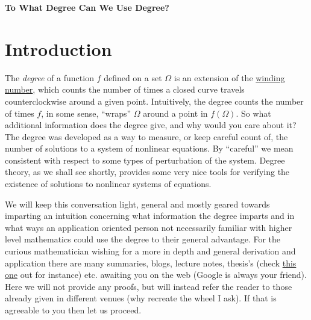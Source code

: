 \documentclass[11pt]{article}
\theoremstyle{plain}
\theoremstyle{definition}
\theoremstyle{remark}
\begin{document}
\begin{center}
\textbf{To What Degree Can We Use Degree?} %
\end{center}

\section{Introduction}
The \emph{degree} of a function $f$ defined on a set $\Omega$
is an extension of the \href{https://en.wikipedia.org/wiki/Winding_number}{winding number},
which counts the number of times a closed curve travels counterclockwise around a given point.
Intuitively, the degree counts the number of times $f$, in some sense, ``wraps'' $\Omega$ around a point in $f\left(\Omega\right)$.   
So what additional information does the degree give, and why would you care about it?
The degree was developed as a way to measure, or keep careful count of, the number of solutions to a system of nonlinear equations.
By ``careful'' we mean consistent with respect to some types of perturbation of the system.
Degree theory, as we shall see shortly, provides some very nice tools for verifying the existence of solutions to nonlinear systems of equations. 

\medskip
We will keep this conversation light, general and mostly geared towards imparting an intuition concerning what information the degree imparts and in what ways an application oriented person not necessarily familiar with higher level mathematics could use the degree to their general advantage. For the curious mathematician wishing for a more in depth and general derivation and application there are many summaries, blogs, lecture notes, thesis's (check \href{http://jultika.oulu.fi/files/isbn9789514284878.pdf}{this one} out for instance) etc. awaiting you on the web (Google is always your friend). Here we will not provide any proofs, but will instead refer the reader to those already given in different venues (why recreate the wheel I ask). If that is agreeable to you then let us proceed. 
\end{document}
